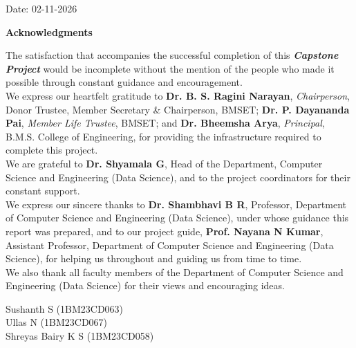 \vspace{1.2cm}

\begin{flushleft}
    Date: 02-11-2026
\end{flushleft}

\newpage
{}
\begin{center}
\textbf{\Large Acknowledgments}
\end{center}

\noindent The satisfaction that accompanies the successful completion of this \textit{\textbf{Capstone Project}} would be incomplete without the mention of the people who made it possible through constant guidance and encouragement.\\
\noindent We express our heartfelt gratitude to \textbf{Dr. B. S. Ragini Narayan}, \textit{Chairperson}, Donor Trustee, Member Secretary \& Chairperson, BMSET; \textbf{Dr. P. Dayananda Pai}, \textit{Member Life Trustee}, BMSET; and \textbf{Dr. Bheemsha Arya}, \textit{Principal}, B.M.S. College of Engineering, for providing the infrastructure required to complete this project.\\
\noindent We are grateful to \textbf{Dr. Shyamala G}, Head of the Department, Computer Science and Engineering (Data Science), and to the project coordinators for their constant support.\\
\noindent We express our sincere thanks to \textbf{Dr. Shambhavi B R}, Professor, Department of Computer Science and Engineering (Data Science), under whose guidance this report was prepared, and to our project guide, \textbf{Prof. Nayana N Kumar}, Assistant Professor, Department of Computer Science and Engineering (Data Science), for helping us throughout and guiding us from time to time.\\
\noindent We also thank all faculty members of the Department of Computer Science and Engineering (Data Science) for their views and encouraging ideas.

\vspace{1.8cm}
\begin{flushright}
Sushanth S (1BM23CD063)\\
Ullas N (1BM23CD067)\\
Shreyas Bairy K S (1BM23CD058)\\
\end{flushright}

\newpage
{}

\newpage
{}

\newpage
{}

\clearpage
\endgroup
\restoregeometry
